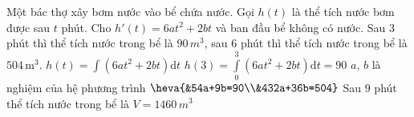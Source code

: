 \begin{ex}%

	Một bác thợ xây bơm nước vào bể chứa nước. Gọi $h(t)$ là thể tích nước bơm được sau $t$ phút. Cho $h'(t)=6a t^2+2b t$ và ban đầu bể không có nước. Sau $3$ phút thì thể tích nước trong bể là $90\,m^3$, sau $6$ phút thì thể tích nước trong bể là $504\,\mathrm{m}^3$. 
	\choiceTF
	{\True $h(t)=\displaystyle\int\left(6a t^2+2b t\right) \mathrm{d} t$ }
	{\True $h(3)=\displaystyle\int\limits_0^3\left(6a t^2+2b t\right) \mathrm{d} t=90$ }
	{\True $a$, $b$ là nghiệm của hệ phương trình $\heva{&54a+9b=90\\&432a+36b=504}$ }
	{ Sau $9$ phút thể tích nước trong bể là $V=1460 \,m^3$ }
\end{ex}

